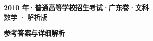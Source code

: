 \documentclass[zihao=-4, a4paper]{ctexart}
\begin{document}
\begin{center}
  {\Large\bfseries 2010 年·普通高等学校招生考试·广东卷·文科}\\[4pt]
  {\large 数学 · 解析版}
\end{center}
\medskip
{}

\clearpage
{}
\begin{center}{\Large\bfseries 参考答案与详细解析}\end{center}
\medskip

\end{document}
